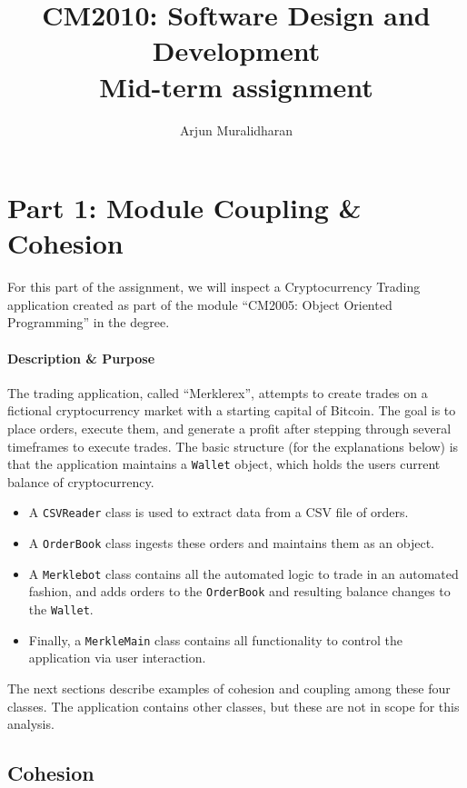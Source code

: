 \title{CM2010: Software Design and Development \\ Mid-term assignment}
\author{Arjun Muralidharan}



\section{Part 1: Module Coupling \& Cohesion} %
\label{sec:part_1_module_coupling_&_cohesion}
For this part of the assignment, we will inspect a Cryptocurrency Trading application created as part of the module ``CM2005: Object Oriented Programming'' in the degree.

\paragraph{Description \& Purpose} %
\label{par:description_&_purpose}
The trading application, called ``Merklerex'', attempts to create trades on a fictional cryptocurrency market with a starting capital of Bitcoin. The goal is to place orders, execute them, and generate a profit after stepping through several timeframes to execute trades.
The basic structure (for the explanations below) is that the application maintains a \texttt{Wallet} object, which holds the users current balance of cryptocurrency. 
\begin{itemize}
	\item A \texttt{CSVReader} class is used to extract data from a CSV file of orders.
	\item A \texttt{OrderBook} class ingests these orders and maintains them as an object.
	\item A \texttt{Merklebot} class contains all the automated logic to trade in an automated fashion, and adds orders to the \texttt{OrderBook} and resulting balance changes to the \texttt{Wallet}.
	\item Finally, a \texttt{MerkleMain} class contains all functionality to control the application via user interaction.
\end{itemize}

The next sections describe examples of cohesion and coupling among these four classes. The application contains other classes, but these are not in scope for this analysis.

\subsection{Cohesion} %
\label{ssub:cohesion}

